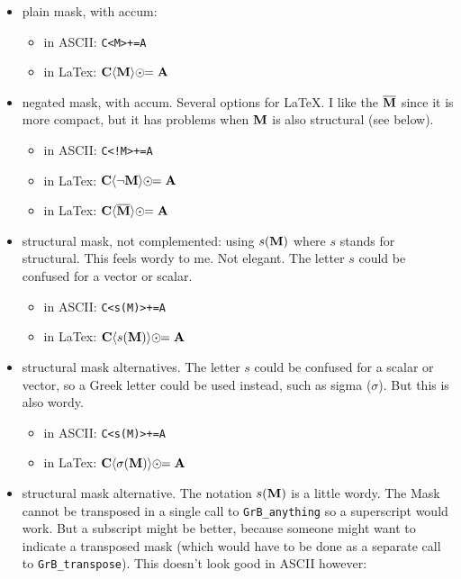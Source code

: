 \documentclass[11pt]{article}
\begin{document}
\begin{itemize}
\item plain mask, with accum:

    \begin{itemize}
    \item[] in ASCII: \verb'C<M>+=A'
    \item[] in LaTex: $\bf C \langle M \rangle \odot\!\!= A $
    \end{itemize}

\item negated mask, with accum.  Several options for LaTeX.
I like the $\overline{\bf M}$ since it is more compact, but it
has problems when $\bf M$ is also structural (see below).

    \begin{itemize}
    \item[] in ASCII: \verb'C<!M>+=A'
    \item[] in LaTex: $\bf C \langle \neg M \rangle \odot\!\!= A$
    \item[] in LaTex:  $\bf C \langle \overline{M} \rangle \odot\!\!= A$
    \end{itemize}

\item structural mask, not complemented:
using $s({\bf M})$ where $s$ stands for structural.
This feels wordy to me.  Not elegant.
The letter $s$ could be confused for a vector or scalar.

    \begin{itemize}
    \item[] in ASCII: \verb'C<s(M)>+=A'
    \item[] in LaTex:  ${\bf C} \langle s({\bf M}) \rangle \odot\!\!= {\bf A}$
    \end{itemize}

\item structural mask alternatives.  The letter $s$ could be confused
for a scalar or vector, so a Greek letter could be used instead,
such as sigma ($\sigma$).  But this is also wordy.

    \begin{itemize}
    \item[] in ASCII: \verb'C<s(M)>+=A'
    \item[] in LaTex:  ${\bf C} \langle \sigma({\bf M}) \rangle \odot\!\!= {\bf A}$
    \end{itemize}

\item structural mask alternative.  The notation 
$s({\bf M})$ is a little wordy.  The Mask cannot be transposed in a
single call to \verb'GrB_anything' so a superscript would work.  But a
subscript might be better, because someone might want to indicate a
transposed mask (which would have to be done as a separate call to
\verb'GrB_transpose').  This doesn't look good in ASCII however:


\end{itemize}
\end{document}
